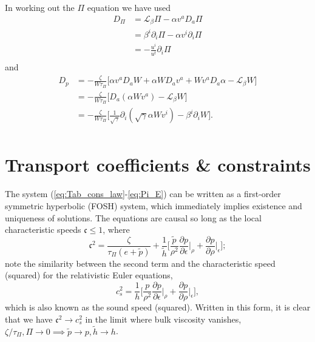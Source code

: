 \documentclass[12pt]{article}
\numberwithin{equation}{section}
\begin{document}
In working out the $\Pi$ equation we have used
\begin{equation}
\begin{aligned}
D_\Pi &= \mathcal{L}_\beta \Pi - \alpha v^a D_a \Pi \\
&= \beta^i \partial_i \Pi - \alpha v^i \partial_i \Pi \\
&= - \frac{u^i}{u^t} \partial_i \Pi \\
\end{aligned}
\end{equation}
and
\begin{equation}
\begin{aligned}
D_p &= - \frac{\zeta}{W \tau_{\Pi}} \Big[ \alpha v^a D_a W + \alpha W D_a v^a + W v^a D_a \alpha - \mathcal{L}_\beta W \Big] \\
&= - \frac{\zeta}{W \tau_{\Pi}} \Big[ D_a (\alpha W v^a) - \mathcal{L}_\beta W \Big] \\
&= - \frac{\zeta}{W \tau_{\Pi}} \Big[ \frac{1}{\sqrt{\gamma}} \partial_i (\sqrt{\gamma} \alpha W v^i) - \beta^i \partial_i W \Big]. \\
\end{aligned}
\end{equation}

\section{Transport coefficients \& constraints}

The system (\ref{eq:Tab_cons_law}-\ref{eq:Pi_E}) can be written as a first-order symmetric hyperbolic (FOSH) system, which immediately implies existence and uniqueness of solutions.
The equations are causal so long as the local characteristic speeds $\mathfrak{c} \leq 1$, where
\begin{equation}
\mathfrak{c}^2 = \frac{\zeta}{\tau_{\Pi} (e + \tilde{p})} + \frac{1}{\tilde{h}} \Big[ \frac{\tilde{p}}{\rho^2} \frac{\partial p}{\partial \epsilon} \Big|_\rho + \frac{\partial p}{\partial \rho} \Big|_\epsilon \Big];
\end{equation}
note the similarity between the second term and the characteristic speed (squared) for the relativistic Euler equations,
\begin{equation}
c_s^2 = \frac{1}{h} \Big[ \frac{p}{\rho^2} \frac{\partial p}{\partial \epsilon} \Big|_\rho + \frac{\partial p}{\partial \rho} \Big|_\epsilon \Big],
\end{equation}
which is also known as the sound speed (squared).
Written in this form, it is clear that we have $\mathfrak{c}^2 \to c_s^2$ in the limit where bulk viscosity vanishes, $\zeta/\tau_{\Pi}, \Pi \to 0 \implies \tilde{p} \to p, \tilde{h} \to h$.
\end{document}
